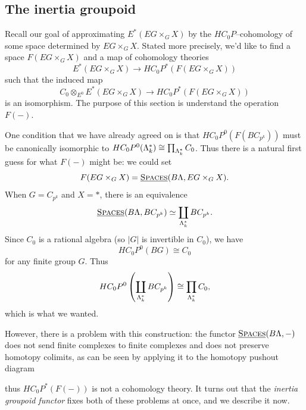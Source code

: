 \subsection*{The inertia groupoid}

Recall our goal of approximating \(E^*(EG \times_G X)\) by the \(HC_0P\)--cohomology of some space determined by \(EG \times_G X\).
Stated more precisely, we'd like to find a space \(F(EG \times_G X)\) and a map of cohomology theories
\[
E^*(EG \times_G X) \to HC_0P^*(F(EG \times_G X))
\]
such that the induced map
\[
C_0 \otimes_{E^0} E^*(EG \times_G X) \to HC_0P^*(F(EG \times_G X))
\]
is an isomorphism.
The purpose of this section is understand the operation \(F(-)\). 

One condition that we have already agreed on is that \(HC_0P^0(F(BC_{p^k}))\) must be canonically isomorphic to \(HC_0P^0(\Lambda_k^*) \cong \prod_{\Lambda_k^*}C_0\).
Thus there is a natural first guess for what \(F(-)\) might be: we could set 
\[
F(EG \times_G X) = \operatorname{\underline{\smash{\normalfont\textsc{Spaces}}}}(B\Lambda, EG \times_G X).
\]
When \(G = C_{p^k}\) and \(X = *\), there is an equivalence
\[
\operatorname{\underline{\smash{\normalfont\textsc{Spaces}}}}(B\Lambda, BC_{p^k}) \simeq \coprod_{\Lambda_k^*} BC_{p^k}.
\]
Since \(C_0\) is a rational algebra (so \(|G|\) is invertible in \(C_0\)), we have 
\[
HC_0P^0(BG) \cong C_0
\]
for any finite group \(G\).
Thus
\[
HC_0P^0\left(\coprod_{\Lambda_k^*} BC_{p^k}\right) \cong \prod_{\Lambda_k^*}C_0,
\]
which is what we wanted.

However, there is a problem with this construction: the functor \(\operatorname{\underline{\smash{\normalfont\textsc{Spaces}}}}(B\Lambda,-)\) does not send finite complexes to finite complexes and does not preserve homotopy colimits, as can be seen by applying it to the homotopy pushout diagram
\begin{center}
\end{center}
thus \(HC_0P^*(F(-))\) is not a cohomology theory.
It turns out that the \textit{inertia groupoid functor} fixes both of these problems at once, and we describe it now.

%

